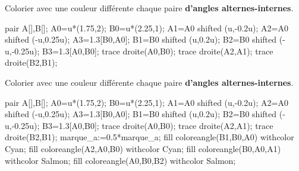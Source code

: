 \begin{exercice*}
    Colorier avec une couleur différente chaque paire \textbf{d'angles alternes-internes}.
    \par\smallskip
    \begin{center}
        \begin{Geometrie}[CoinHD={(3.5u,3u)}]
            pair A[],B[];
            A0=u*(1.75,2);
            B0=u*(2.25,1);
            A1=A0 shifted (u,-0.2u);
            A2=A0 shifted (-u,0.25u);
            A3=1.3[B0,A0];
            B1=B0 shifted (u,0.2u);
            B2=B0 shifted (-u,-0.25u);
            B3=1.3[A0,B0];
            trace droite(A0,B0);
            trace droite(A2,A1);
            trace droite(B2,B1);
        \end{Geometrie}
    \end{center}
\end{exercice*}
\begin{corrige}
    Colorier avec une couleur différente chaque paire \textbf{d'angles alternes-internes}.
    \par\smallskip
    \begin{center}
        \begin{Geometrie}[CoinHD={(3.5u,3u)}]
            pair A[],B[];
            A0=u*(1.75,2);
            B0=u*(2.25,1);
            A1=A0 shifted (u,-0.2u);
            A2=A0 shifted (-u,0.25u);
            A3=1.3[B0,A0];
            B1=B0 shifted (u,0.2u);
            B2=B0 shifted (-u,-0.25u);
            B3=1.3[A0,B0];
            trace droite(A0,B0);
            trace droite(A2,A1);
            trace droite(B2,B1);
            marque_a:=0.5*marque_a;
            fill coloreangle(B1,B0,A0) withcolor Cyan;
            fill coloreangle(A2,A0,B0) withcolor Cyan;
            fill coloreangle(B0,A0,A1) withcolor Salmon;
            fill coloreangle(A0,B0,B2) withcolor Salmon;
        \end{Geometrie}
    \end{center}
\end{corrige}